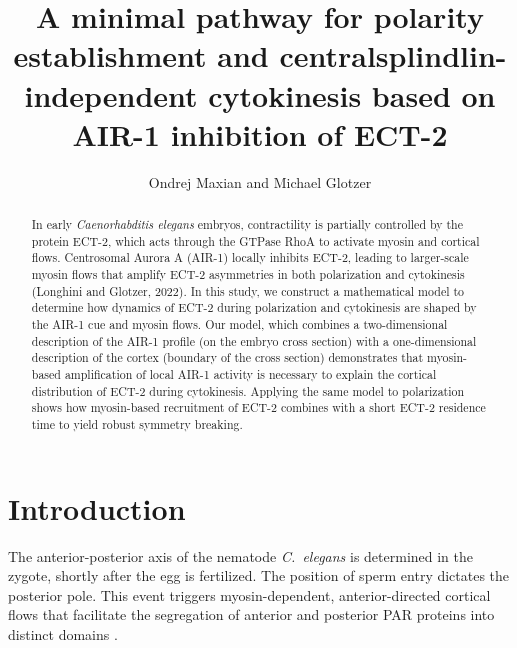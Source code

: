 \documentclass[11pt]{article}
\title{A minimal pathway for polarity establishment and centralsplindlin-independent cytokinesis based on AIR-1 inhibition of ECT-2 \vspace{-0.5 cm}}
\author{Ondrej Maxian and Michael Glotzer \vspace{-0.75 cm}}
\begin{document}
\maketitle

\begin{abstract}
In early \emph{Caenorhabditis elegans} embryos, contractility is partially controlled by the protein ECT-2, which acts through the GTPase RhoA to activate myosin and cortical flows. Centrosomal Aurora A (AIR-1) locally inhibits ECT-2, leading to larger-scale myosin flows that amplify ECT-2 asymmetries in both polarization and cytokinesis (Longhini and Glotzer, 2022). In this study, we construct a mathematical model to determine how dynamics of ECT-2 during polarization and cytokinesis are shaped by the AIR-1 cue and myosin flows. Our model, which combines a two-dimensional description of the AIR-1 profile (on the embryo cross section) with a one-dimensional description of the cortex (boundary of the cross section) demonstrates that myosin-based amplification of local AIR-1 activity is necessary to explain the cortical distribution of ECT-2 during cytokinesis. Applying the same model to polarization shows how myosin-based recruitment of ECT-2 combines with a short ECT-2 residence time to yield robust symmetry breaking.
\end{abstract}

\section{Introduction}
The anterior-posterior axis of the nematode \emph{C.\ elegans} is determined in the zygote, shortly after the egg is fertilized.  The position of sperm entry dictates the posterior pole. This event triggers myosin-dependent, anterior-directed cortical flows that facilitate the segregation of anterior and posterior PAR proteins into distinct domains \citep{munro2004cortical, lang2017proteins, gross2019guiding}.
\end{document}
